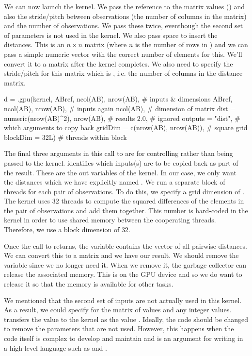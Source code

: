 We can now launch the kernel. We pass the reference
to the matrix values () and also
the stride/pitch between observations (the number of columns in 
the matrix) and the number of observations.
We pass these twice, eventhough the second set of parameters is not
used in the kernel.
We also pass space to insert the distances. This is an $n \times n$
matrix  (where $n$ is the number of rows in )
and we can pass a simple numeric vector with the correct number of
elements for this.  We'll convert it to a matrix after the kernel
completes.
We also need to specify the stride/pitch for this matrix which is
, i.e. the number of columns in the distance matrix.
\begin{RCode}
d = .gpu(kernel,
         ABref, ncol(AB), nrow(AB),            # inputs & dimensions
         ABref, ncol(AB), nrow(AB),            # inputs again
         ncol(AB),                             # dimension of matrix
         dist = numeric(nrow(AB)^2), nrow(AB), # results
         2.0,                                  # ignored
         outputs = "dist",                # which arguments to copy back
         gridDim = c(nrow(AB), nrow(AB)), # square grid
         blockDim = 32L)                  # threads within block
\end{RCode}
The final three arguments in this call to  are for
controlling  rather than being passed to the kernel.
 identifies which inputs(s) are to be copied back as part
of the result. These are the out variables of the kernel.
In our case, we only want the distances which we have explicitly named
.
We run a separate block of threads for each pair of observations.
To do this, we specify a grid dimension of .
The kernel uses $32$ threads to compute the squared differences of the
elements in the pair of observations and add them together.
This number is hard-coded in the kernel in order to use shared memory
between the cooperating threads.
Therefore, we use a block dimension of $32$.

Once the call to  returns, the variable  contains
the vector of all pairwise distances.  We can convert this to a matrix
and we have our result.  We should remove the variable 
since we no longer need it. When we remove it, the garbage collector
can release the associated memory. This is on the GPU device and so we
do want to release it so that the memory is available for other tasks.

We mentioned that the second set of inputs are not actually used in
this kernel. As a result, we could specify \Rnull{} for the matrix
of values and any integer values.   transfers the \R{}
value to the kernel as the \C{} value \Cnull.
Ideally, the code should be changed to remove the parameters that are
not used. However, this happens when the code itself is complex to
develop and maintain and is an argument for writing in a high-level
language such as \R{} and .

